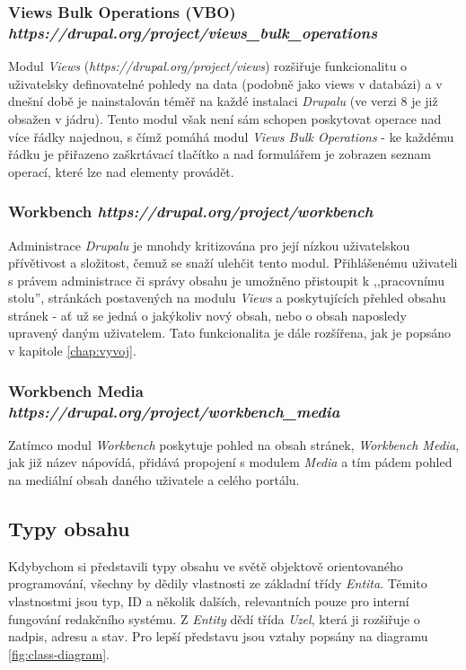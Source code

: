 \subsubsection*{\textbf{Views Bulk Operations} (VBO) \hfill \emph{https://drupal.org/project/views\_bulk\_operations}}
\label{subsec:vbo}
Modul \emph{Views} (\emph{https://drupal.org/project/views}) rozšiřuje funkcionalitu o uživatelsky definovatelné pohledy na data (podobně jako views v databázi) a v dnešní době je nainstalován téměř na každé instalaci \emph{Drupalu} (ve verzi 8 je již obsažen v jádru). Tento modul však není sám schopen poskytovat operace nad více řádky najednou, s čímž pomáhá modul \emph{Views Bulk Operations} - ke každému řádku je přiřazeno zaškrtávací tlačítko a nad formulářem je zobrazen seznam operací, které lze nad elementy provádět.

\subsubsection*{\textbf{Workbench} \hfill \emph{https://drupal.org/project/workbench}}
\label{subsec:workbench}
Administrace \emph{Drupalu} je mnohdy kritizována pro její nízkou uživatelskou přívětivost a složitost, čemuž se snaží ulehčit tento modul. Přihlášenému uživateli s právem administrace či správy obsahu je umožněno přistoupit k ,,pracovnímu stolu'', stránkách postavených na modulu \emph{Views} a poskytujících přehled obsahu stránek - ať už se jedná o jakýkoliv nový obsah, nebo o obsah naposledy upravený daným uživatelem. Tato funkcionalita je dále rozšířena, jak je popsáno v kapitole \ref{chap:vyvoj}.

\subsubsection*{\textbf{Workbench Media} \hfill \emph{https://drupal.org/project/workbench\_media}}
Zatímco modul \emph{Workbench} poskytuje pohled na obsah stránek, \emph{Workbench Media}, jak již název nápovídá, přidává propojení s modulem \emph{Media} a tím pádem pohled na mediální obsah daného uživatele a celého portálu. 

\subsection{Typy obsahu}
\label{subsec:typy-obsahu}

Kdybychom si představili typy obsahu ve světě objektově orientovaného programování, všechny by dědily vlastnosti ze základní třídy \emph{Entita}. Těmito vlastnostmi jsou typ, ID a několik dalších, relevantních pouze pro interní fungování redakčního systému. Z \emph{Entity} dědí třída \emph{Uzel}, která ji rozšiřuje o nadpis, adresu a stav. Pro lepší představu jsou vztahy popsány na diagramu \ref{fig:class-diagram}. 

